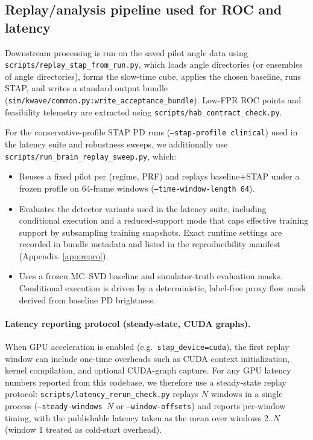 \documentclass[11pt]{article}
\DeclareRobustCommand{\path}[1]{\nolinkurl{#1}}
\newif\ifSTAPPAPERONLY
\newcommand{\SuppOrApp}[1]{\ifSTAPPAPERONLY Supplementary Material\else Appendix~\ref{#1}\fi}
\begin{document}
\subsection{Replay/analysis pipeline used for ROC and latency}
Downstream processing is run on the saved pilot angle data using \path{scripts/replay_stap_from_run.py}, which loads angle directories (or ensembles of angle directories), forms the slow-time cube, applies the chosen baseline, runs STAP, and writes a standard output bundle (\path{sim/kwave/common.py:write_acceptance_bundle}). Low-FPR ROC points and feasibility telemetry are extracted using \path{scripts/hab_contract_check.py}.

For the conservative-profile STAP PD runs (\texttt{--stap-profile clinical}) used in the latency suite and robustness sweeps, we additionally use \path{scripts/run_brain_replay_sweep.py}, which:
\begin{itemize}[nosep]
  \item Reuses a fixed pilot per (regime, PRF) and replays baseline+STAP under a frozen profile on 64-frame windows (\texttt{--time-window-length 64}).
  \item Evaluates the detector variants used in the latency suite, including conditional execution and a reduced-support mode that caps effective training support by subsampling training snapshots. Exact runtime settings are recorded in bundle metadata and listed in the reproducibility manifest (\SuppOrApp{app:repro}).
  \item Uses a frozen MC--SVD baseline and simulator-truth evaluation masks. Conditional execution is driven by a deterministic, label-free proxy flow mask derived from baseline PD brightness.
\end{itemize}

\paragraph{Latency reporting protocol (steady-state, CUDA graphs).}
When GPU acceleration is enabled (e.g.\ \path{stap_device=cuda}), the first replay window can include one-time overheads such as CUDA context initialization, kernel compilation, and optional CUDA-graph capture. For any GPU latency numbers reported from this codebase, we therefore use a steady-state replay protocol: \path{scripts/latency_rerun_check.py} replays $N$ windows in a single process (\texttt{--steady-windows $N$} or \texttt{--window-offsets}) and reports per-window timing, with the publishable latency taken as the mean over windows 2..$N$ (window 1 treated as cold-start overhead).
\end{document}
